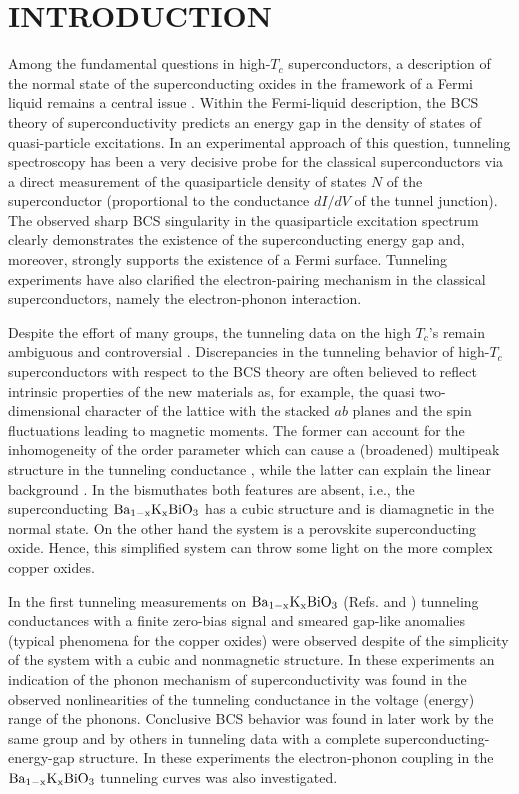 \documentclass[twocolumn,amsmath,floats,showpacs,nofootinbib]{revtex4}
\begin{document}
\maketitle
\section{INTRODUCTION}
Among the fundamental questions in high-$T_c$ superconductors, a description of the normal state of the superconducting oxides in the framework of a Fermi liquid remains a central issue \cite{1}. Within the Fermi-liquid description, the BCS theory of superconductivity predicts an energy gap in the density of states of quasi-particle excitations. In an experimental approach of this question, tunneling spectroscopy has been a very decisive probe for the classical superconductors via a direct measurement of the quasiparticle density of states $N$ of the superconductor (proportional to the conductance $dI/dV$ of the tunnel junction). The observed sharp BCS singularity in the quasiparticle excitation spectrum clearly demonstrates the existence of the superconducting energy gap and, moreover, strongly supports the existence of a Fermi surface. Tunneling experiments have also clarified the electron-pairing mechanism in the classical superconductors, namely the electron-phonon interaction.

Despite the effort of many groups, the tunneling data on the high $T_c$'s remain ambiguous and controversial \cite{2}. Discrepancies in the tunneling behavior of high-$T_c$ superconductors with respect to the BCS theory are often believed to reflect intrinsic properties of the new materials as, for example, the quasi two-dimensional character of the lattice with the stacked $ab$ planes and the spin fluctuations leading to magnetic moments. The former can account for the inhomogeneity of the order parameter which can cause a (broadened) multipeak structure in the tunneling conductance \cite{3}, while the latter can explain the linear background \cite{4}. In the bismuthates both features are absent, i.e., the superconducting $\rm Ba_{1-x}K_xBiO_3$ has a cubic structure and is diamagnetic in the normal state. On the other hand the system is a perovskite superconducting oxide. Hence, this simplified system can throw some light on the more complex copper oxides.

In the first tunneling measurements on $\rm Ba_{1-x}K_xBiO_3$ (Refs.\cite{5} and \cite{6}) tunneling conductances with a finite zero-bias signal and smeared gap-like anomalies (typical phenomena for the copper oxides) were observed despite of the simplicity of the system with a cubic and nonmagnetic structure. In these experiments an indication of the phonon mechanism of superconductivity was found in the observed nonlinearities of the tunneling conductance in the voltage (energy) range of the phonons. Conclusive BCS behavior was found in later work by the same group \cite{7} and by others \cite{8,9} in tunneling data with a complete superconducting-energy-gap structure. In these experiments \cite{7,8} the electron-phonon coupling in the $\rm Ba_{1-x}K_xBiO_3$ tunneling curves was also investigated.
\end{document}
